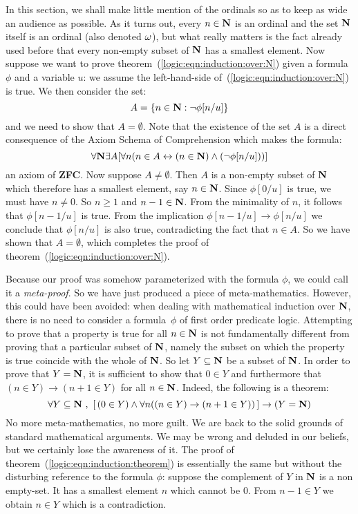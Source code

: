 In this section, we shall make little mention of the ordinals so as
to keep as wide an audience as possible. As it turns out, every
$n\in\mbox{$\bf N$}$ is an ordinal and the set $\mbox{$\bf N$}$ itself is an ordinal (also
denoted $\mbox{$\omega$}$), but what really matters is the fact already used
before that every non-empty subset of $\mbox{$\bf N$}$ has a smallest element.
Now suppose we want to prove
theorem~(\ref{logic:eqn:induction:over:N}) given a formula $\phi$
and a variable $u$: we assume the left-hand-side
of~(\ref{logic:eqn:induction:over:N}) is true. We then consider the
set:
    \[
    A=\{n\in\mbox{$\bf N$}:\lnot\phi[n/u]\}
    \]
and we need to show that $A=\emptyset$. Note that the existence of
the set $A$ is a direct consequence of the Axiom Schema of
Comprehension which makes the formula:
    \[
    \forall\mbox{$\bf N$}\exists A[\forall n(n\in A\leftrightarrow (n\in\mbox{$\bf N$})\land(\lnot\phi[n/u]))]
    \]
an axiom of {\bf ZFC}. Now suppose $A\neq\emptyset$. Then $A$ is a
non-empty subset of $\mbox{$\bf N$}$ which therefore has a smallest element, say
$n\in\mbox{$\bf N$}$. Since $\phi[0/u]$ is true, we must have $n\neq 0$. So
$n\geq 1$ and $n-1\in\mbox{$\bf N$}$. From the minimality of $n$, it follows
that $\phi[n-1/u]$ is true. From the implication
$\phi[n-1/u]\to\phi[n/u]$ we conclude that $\phi[n/u]$ is also true,
contradicting the fact that $n\in A$. So we have shown that
$A=\emptyset$, which completes the proof of
theorem~(\ref{logic:eqn:induction:over:N}).

Because our proof was somehow parameterized with the formula $\phi$,
we could call it a {\em meta-proof}. So we have just produced a
piece of meta-mathematics. However, this could have been avoided:
when dealing with mathematical induction over $\mbox{$\bf N$}$, there is no need
to consider a formula~$\phi$ of first order predicate logic.
Attempting to prove that a property is true for all $n\in\mbox{$\bf N$}$ is not
fundamentally different from proving that a particular subset of
$\mbox{$\bf N$}$, namely the subset on which the property is true coincide with
the whole of $\mbox{$\bf N$}$. So let $Y\subseteq\mbox{$\bf N$}$ be a subset of $\mbox{$\bf N$}$. In
order to prove that $Y=\mbox{$\bf N$}$, it is sufficient to show that $0\in Y$
and furthermore that $(n\in Y)\to(n+1\in Y)$ for all $n\in\mbox{$\bf N$}$.
Indeed, the following is a theorem:
    \begin{equation}\label{logic:eqn:induction:theorem}
    \forall Y\subseteq\mbox{$\bf N$}\ ,\ [\,(0\in Y)\land\forall n((n\in Y)
    \to (n+1\in Y))\,]\to (Y=\mbox{$\bf N$})
    \end{equation}
No more meta-mathematics, no more guilt. We are back to the solid
grounds of standard mathematical arguments. We may be wrong and
deluded in our beliefs, but we certainly lose the awareness of it.
The proof of theorem~(\ref{logic:eqn:induction:theorem}) is
essentially the same but without the disturbing reference to the
formula $\phi$: suppose the complement of $Y$ in $\mbox{$\bf N$}$ is a non
empty-set. It has a smallest element $n$ which cannot be $0$. From
$n-1\in Y$ we obtain $n\in Y$ which is a contradiction.

